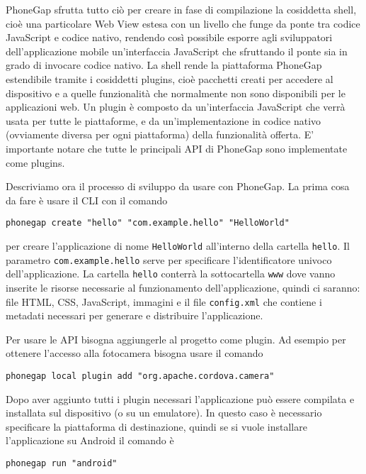             PhoneGap sfrutta tutto ciò per creare in fase di compilazione la
            cosiddetta shell, cioè una particolare
            Web View estesa con un livello che funge da ponte
            tra codice JavaScript e codice nativo, rendendo così possibile esporre
            agli sviluppatori dell'applicazione mobile un'interfaccia JavaScript
            che sfruttando il ponte sia in grado di invocare codice nativo.
            La shell rende la piattaforma PhoneGap estendibile tramite i cosiddetti
            plugins, cioè pacchetti creati per accedere al dispositivo e a quelle
            funzionalità che normalmente non sono disponibili per le applicazioni
            web. Un plugin è composto da un'interfaccia JavaScript che
            verrà usata per tutte le piattaforme, e da un'implementazione
            in codice nativo (ovviamente diversa per ogni piattaforma)
            della funzionalità offerta.
            E' importante notare che tutte le principali API di PhoneGap sono
            implementate come plugins.

            Descriviamo ora il processo di sviluppo da usare con PhoneGap.
            La prima cosa da fare è usare il CLI con il comando
    \begin{lstlisting}[language=MyBash]
  phonegap create "hello" "com.example.hello" "HelloWorld"
    \end{lstlisting}
            per creare l'applicazione di nome \verb|HelloWorld| all'interno della cartella
            \verb|hello|. Il parametro \verb|com.example.hello| serve per
            specificare l'identificatore univoco dell'applicazione.
            La cartella \verb|hello| conterrà la sottocartella \verb|www| dove
            vanno inserite le risorse necessarie al funzionamento dell'applicazione,
            quindi ci saranno: file HTML, CSS, JavaScript, immagini e il file
            \verb|config.xml| che contiene i metadati necessari per generare e
            distribuire l'applicazione.

            Per usare le API bisogna aggiungerle al progetto come plugin. Ad
            esempio per ottenere l'accesso alla fotocamera bisogna usare il comando
    \begin{lstlisting}[language=MyBash]
  phonegap local plugin add "org.apache.cordova.camera"
    \end{lstlisting}

            Dopo aver aggiunto tutti i plugin necessari l'applicazione può
            essere compilata e installata sul dispositivo (o su un emulatore).
            In questo caso è necessario specificare la piattaforma di destinazione,
            quindi se si vuole installare l'applicazione su Android il comando è
    \begin{lstlisting}[language=MyBash]
  phonegap run "android"
    \end{lstlisting}

